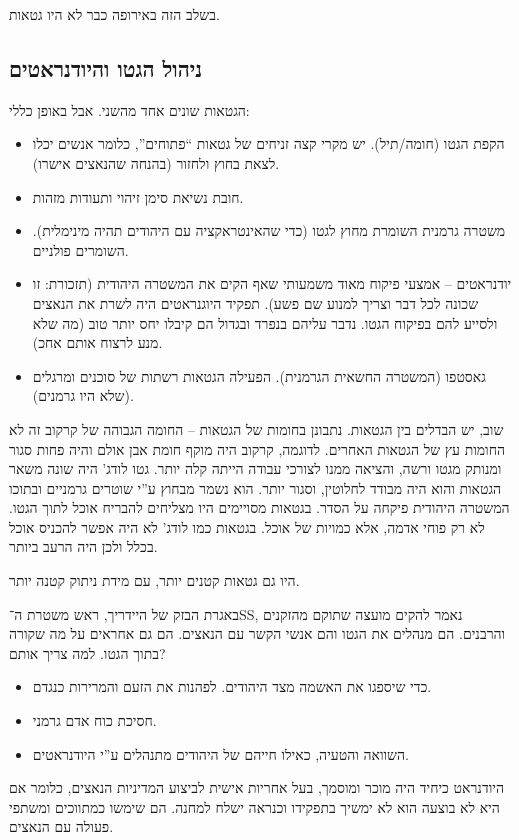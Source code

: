 \documentclass[a4paper]{book}
\begin{document}
	
	בשלב הזה באירופה כבר לא היו גטאות. 
	
	\subsection{ניהול הגטו והיודנראטים}
	הגטאות שונים אחד מהשני. אבל באופן כללי: 
	\begin{itemize}
		\item הקפת הגטו (חומה/תיל). יש מקרי קצה זניחים של גטאות ``פתוחים'', כלומר אנשים יכלו לצאת בחוץ ולחזור (בהנחה שהנאצים אישרו). 
		\item חובת נשיאת סימן זיהוי ותעודות מזהות. 
		\item משטרה גרמנית השומרת מחוץ לגטו (כדי שהאינטראקציה עם היהודים תהיה מינימלית). השומרים פולניים. 
		\item יודנראטים – אמצעי פיקוח מאוד משמעותי שאף הקים את המשטרה היהודית (תזכורת: זו שכונה לכל דבר וצריך למנוע שם פשע). תפקיד היוגנראטים היה לשרת את הנאצים ולסייע להם בפיקוח הגטו. נדבר עליהם בנפרד ובגדול הם קיבלו יחס יותר טוב (מה שלא מנע לרצוח אותם אחכ). 
		\item גאסטפו (המשטרה החשאית הגרמנית). הפעילה הגטאות רשתות של סוכנים ומרגלים (שלא היו גרמנים). 
	\end{itemize}
	
	שוב, יש הבדלים בין הגטאות. נתבונן בחומות של הגטאות – החומה הגבוהה של קרקוב זה לא החומות עץ של הגטאות האחרים. לדוגמה, קרקוב היה מוקף חומת אבן אולם והיה פחות סגור ומנותק מגטו ורשה, והציאה ממנו לצורכי עבודה הייתה קלה יותר. גטו לודג' היה שונה משאר הגטאות והוא היה מבודד לחלוטין, וסגור יותר. הוא נשמר מבחוץ ע''י שוטרים גרמניים ובתוכו המשטרה היהודית פיקחה על הסדר. בגטאות מסויימים היו מצליחים להבריח אוכל לתוך הגטו. לא רק פוחי אדמה, אלא כמויות של אוכל. בגטאות כמו לודג' לא היה אפשר להכניס אוכל בכלל ולכן היה הרעב ביותר. 
	
	היו גם גטאות קטנים יותר, עם מידת ניתוק קטנה יותר. 
	
	באגרת הבזק של היידריך, ראש משטרת ה־SS, נאמר להקים מועצה שתוקם מהזקנים והרבנים. הם מנהלים את הגטו והם אנשי הקשר עם הנאצים. הם גם אחראים על מה שקורה בתוך הגטו. 
	למה צריך אותם? 
	\begin{itemize}
		\item כדי שיספגו את האשמה מצד היהודים. לפהנות את הזעם והמרירות כנגדם. 
		\item חסיכת כוח אדם גרמני. 
		\item השוואה והטעיה, כאילו חייהם של היהודים מתנהלים ע''י היודנראטים. 
	\end{itemize}
	
	היודנראט כיחיד היה מוכר ומוסמך, בעל אחריות אישית לביצוע המדיניות הנאצים, כלומר אם היא לא בוצעה הוא לא ימשיך בתפקידו וכנראה ישלח למחנה. הם שימשו כמתווכים ומשתפי פעולה עם הנאצים. 
	
\end{document}

